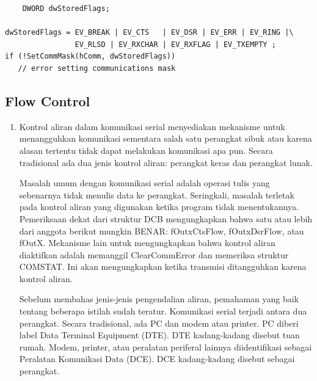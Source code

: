 			
	\begin{verbatim}
	DWORD dwStoredFlags;

dwStoredFlags = EV_BREAK | EV_CTS   | EV_DSR | EV_ERR | EV_RING |\
                EV_RLSD | EV_RXCHAR | EV_RXFLAG | EV_TXEMPTY ;
if (!SetCommMask(hComm, dwStoredFlags))
   // error setting communications mask
\end{verbatim}
\subsection{Flow Control}
	\begin{enumerate}
		\item Kontrol aliran dalam komunikasi serial menyediakan mekanisme untuk menangguhkan komunikasi sementara salah satu perangkat sibuk atau karena alasan tertentu tidak dapat melakukan komunikasi apa pun. Secara tradisional ada dua jenis kontrol aliran: perangkat keras dan perangkat lunak.

Masalah umum dengan komunikasi serial adalah operasi tulis yang sebenarnya tidak menulis data ke perangkat. Seringkali, masalah terletak pada kontrol aliran yang digunakan ketika program tidak menentukannya. Pemeriksaan dekat dari struktur DCB mengungkapkan bahwa satu atau lebih dari anggota berikut mungkin BENAR: fOutxCtsFlow, fOutxDsrFlow, atau fOutX. Mekanisme lain untuk mengungkapkan bahwa kontrol aliran diaktifkan adalah memanggil ClearCommError dan memeriksa struktur COMSTAT. Ini akan mengungkapkan ketika transmisi ditangguhkan karena kontrol aliran.

Sebelum membahas jenis-jenis pengendalian aliran, pemahaman yang baik tentang beberapa istilah sudah teratur. Komunikasi serial terjadi antara dua perangkat. Secara tradisional, ada PC dan modem atau printer. PC diberi label Data Terminal Equipment (DTE). DTE kadang-kadang disebut tuan rumah. Modem, printer, atau peralatan periferal lainnya diidentifikasi sebagai Peralatan Komunikasi Data (DCE). DCE kadang-kadang disebut sebagai perangkat.
\end{enumerate}

\cite{bai2004windows}
\cite{carvey2005tracking}
\cite{boling2003programming}			
